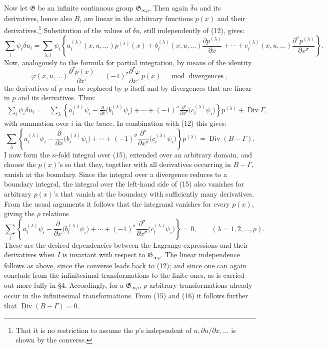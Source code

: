\documentclass[11pt]{article}
\providecommand{\Div}{\operatorname{Div}}
\providecommand{\G}{\mathfrak G}
\providecommand{\bd}{\bar{\delta}}
\providecommand{\p}{\partial}
\providecommand{\p}{\partial}
\begin{document}
Now let \(\G\) be an infinite continuous group \(\G_{\infty\rho}\). Then again \(\bd u\) and its derivatives, hence also \(B\), are linear in the arbitrary functions \(p(x)\) and their derivatives.\footnote{That it is no restriction to assume the \(p\)'s independent of \(u,\p u/\p x,\ldots\) is shown by the converse.} Substitution of the values of \(\bd u\), still independently of (12), gives:
\[
\sum_i\psi_i\bd u_i
=\sum_{\lambda,i}\psi_i\left\{
a_i^{(\lambda)}(x,u,\ldots)p^{(\lambda)}(x)
+b_i^{(\lambda)}(x,u,\ldots)\frac{\p p^{(\lambda)}}{\p x}
+\cdots+c_i^{(\lambda)}(x,u,\ldots)
\frac{\p^\sigma p^{(\lambda)}}{\p x^\sigma}\right\}.
\]
Now, analogously to the formula for partial integration, by means of the identity
\[
\varphi(x,u,\ldots)\frac{\p^\tau p(x)}{\p x^\tau}
=(-1)^\tau\frac{\p^\tau\varphi}{\p x^\tau}\,p(x)
\quad \bmod \text{ divergences},
\]
the derivatives of \(p\) can be replaced by \(p\) itself and by divergences that are linear in \(p\) and its derivatives. Thus:
\begin{equation}
\begin{aligned}
\sum_i\psi_i\bd u_i
={}&\sum_\lambda\left\{
a_i^{(\lambda)}\psi_i-\frac{\p}{\p x}\bigl(b_i^{(\lambda)}\psi_i\bigr)
+\cdots+(-1)^\sigma
\frac{\p^\sigma}{\p x^\sigma}\bigl(c_i^{(\lambda)}\psi_i\bigr)
\right\}p^{(\lambda)}+\Div\Gamma,
\end{aligned}
\tag{14}
\end{equation}
with summation over \(i\) in the brace. In combination with (12) this gives:
\begin{equation}
\sum_\lambda\left\{
a_i^{(\lambda)}\psi_i-\frac{\p}{\p x}\bigl(b_i^{(\lambda)}\psi_i\bigr)
+\cdots+(-1)^\sigma
\frac{\p^\sigma}{\p x^\sigma}\bigl(c_i^{(\lambda)}\psi_i\bigr)
\right\}p^{(\lambda)}
=\Div(B-\Gamma).
\tag{15}
\end{equation}
I now form the \(n\)-fold integral over (15), extended over an arbitrary domain, and choose the \(p(x)\)'s so that they, together with all derivatives occurring in \(B-\Gamma\), vanish at the boundary. Since the integral over a divergence reduces to a boundary integral, the integral over the left-hand side of (15) also vanishes for arbitrary \(p(x)\)'s that vanish at the boundary with sufficiently many derivatives. From the usual arguments it follows that the integrand vanishes for every \(p(x)\), giving the \(\rho\) relations
\begin{equation}
\sum_i\left\{
a_i^{(\lambda)}\psi_i-\frac{\p}{\p x}\bigl(b_i^{(\lambda)}\psi_i\bigr)
+\cdots+(-1)^\sigma
\frac{\p^\sigma}{\p x^\sigma}\bigl(c_i^{(\lambda)}\psi_i\bigr)
\right\}=0,\qquad(\lambda=1,2,\ldots,\rho).
\tag{16}
\end{equation}
These are the desired dependencies between the Lagrange expressions and their derivatives when \(I\) is invariant with respect to \(\G_{\infty\rho}\). The linear independence follows as above, since the converse leads back to (12); and since one can again conclude from the infinitesimal transformations to the finite ones, as is carried out more fully in \S{}4. Accordingly, for a \(\G_{\infty\rho}\), \(\rho\) arbitrary transformations already occur in the infinitesimal transformations. From (15) and (16) it follows further that \(\Div(B-\Gamma)=0\).
\end{document}
